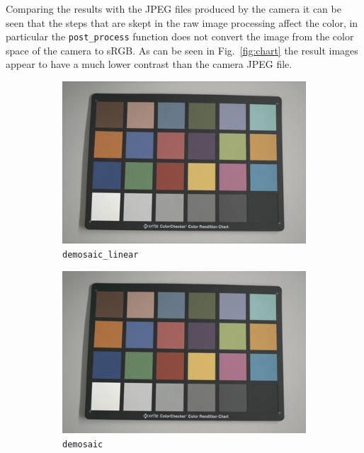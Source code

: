 \documentclass{article}
\newcommand{\inlinecode}[1]{\lstinline[basicstyle=\ttfamily,keywordstyle={}]{#1}}
\begin{document}
Comparing the results with the JPEG files produced by the camera it
can be seen that the steps that are skept in the raw image processing
affect the color, in particular the \inlinecode{post_process} function
does not convert the image from the color space of the camera to
sRGB. As can be seen in Fig.~\ref{fig:chart} the result images appear
to have a much lower contrast than the camera JPEG file.
\begin{figure}[htbp]
  \centering
  \begin{subfigure}{.33\textwidth}
  \centering
  \includegraphics[width=.95\linewidth]{demosaic_macbeth_color_small}
  \caption{\inlinecode{demosaic_linear}}
\end{subfigure}%
\begin{subfigure}{.33\textwidth}
  \centering
  \includegraphics[width=.95\linewidth]{matlab_demosaic_macbeth_color_small}
  \caption{\inlinecode{demosaic}}
\end{subfigure}%
  \begin{subfigure}{.33\textwidth}

\end{subfigure}
\end{figure}
\end{document}

